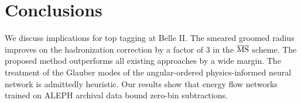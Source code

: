 \section{Conclusions}\label{sec:conclusions}

We discuss implications for top tagging at Belle II. The smeared groomed
radius improves on the hadronization correction by a factor of 3 in the
$\overline{\rm MS}$ scheme. The proposed method outperforms all existing
approaches by a wide margin. The treatment of the Glauber modes of the
angular-ordered physics-informed neural network is admittedly heuristic.
Our results show that energy flow networks trained on ALEPH archival
data bound zero-bin subtractions.

